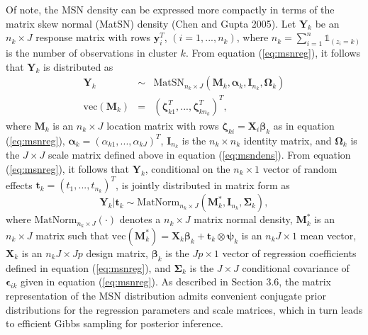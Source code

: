 \documentclass[useAMS,referee]{biom}
\begin{document}
Of note, the MSN density can be expressed more compactly in terms of the matrix skew normal (MatSN) density (Chen and Gupta 2005). Let $\mathbf{Y}_k$ be an ${n_k \times J}$ response matrix with rows $\mathbf{y}_i^T$, $(i = 1,...,n_k)$, where $n_k = \sum_{i = 1}^n \mathds{1}_{(z_i = k)}$ is the number of observations in cluster $k$. From equation (\ref{eq:msnreg}), it follows that $\mathbf{Y}_k$ is distributed as
\begin{eqnarray}
\mathbf{Y}_{k} &\sim& \text{MatSN}_{n_k \times J}(\mathbf{M}_k,\boldsymbol\alpha_k,\mathbf{I}_{n_k},\boldsymbol\Omega_k)\label{eq:matsn}\\
\text{vec}(\mathbf{M}_k) &=& (\boldsymbol\zeta_{k1}^T,...,\boldsymbol\zeta_{kn_k}^T)^T, \nonumber
\end{eqnarray}
where $\mathbf{M}_k$ is an $n_k \times J$ location matrix with rows $\boldsymbol\zeta_{ki} = \mathbf{X}_i \boldsymbol\beta_k$ as in equation (\ref{eq:msnreg}), $\boldsymbol\alpha_k = (\alpha_{k1},...,\alpha_{kJ})^T$, $\mathbf{I}_{n_k}$ is the $n_k\times n_k$ identity matrix, and $\boldsymbol\Omega_k$ is the $J\times J$ scale matrix defined above in equation (\ref{eq:msndens}). From equation (\ref{eq:msnreg}), it follows that $\mathbf{Y}_{k}$, conditional on the $n_k\times 1$ vector of random effects $\mathbf{t}_{k} = (t_1,...,t_{n_k})^T$, is jointly distributed in matrix form as
\begin{equation}
\mathbf{Y}_k | \mathbf{t}_k \sim \text{MatNorm}_{n_k \times J}(\mathbf{M}^*_k, \mathbf{I}_{n_k}, \boldsymbol\Sigma_k),
\end{equation}
where $\text{MatNorm}_{n_k \times J}(\cdot)$ denotes a $n_k\times J$ matrix normal density, $\mathbf{M}^*_k$ is an $n_k \times J$ matrix such that $\text{vec}(\mathbf{M}^*_k) = \mathbf{X}_{k} \boldsymbol\beta_k + \mathbf{t}_k \otimes \boldsymbol\psi_k$ is an $n_kJ\times 1$ mean vector, $\mathbf{X}_k$ is an $n_kJ \times Jp$ design matrix, $\boldsymbol\beta_k$ is the $Jp\times 1$ vector of regression coefficients defined in equation (\ref{eq:msnreg}), and $\boldsymbol\Sigma_k$ is the $J\times J$ conditional covariance of $\boldsymbol\epsilon_{ik}$ given in equation (\ref{eq:msnreg}). As described in Section 3.6, the matrix representation of the MSN distribution admits convenient conjugate prior distributions for the regression parameters and scale matrices, which in turn leads to efficient Gibbs sampling for posterior inference. 
\end{document}
